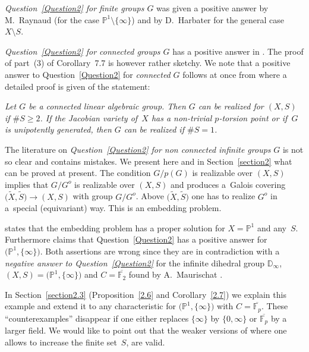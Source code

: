 \documentclass[pdftex]{sigma}
\numberwithin{equation}{section}
\begin{document}
{\it Question~{\rm \ref{Question2}} for finite groups $G$} was given a positive answer by M.~Raynaud (for the case $\mathbb{P}^1\setminus \{\infty \}$) and by D.~Harbater for the general case~$X\setminus S$.

{\it Question~{\rm \ref{Question2}} for connected groups $G$} has a positive answer in \cite[Corollary~7.7]{Ma-vdP1}. The proof of part~(3) of Corollary~7.7 is however rather sketchy. We note that a positive answer to Question~\ref{Question2} for {\it connected} $G$ follows at once from \cite[Theorem 9.12] {R} where a detailed proof is given of the statement:

{\it Let $G$ be a connected linear algebraic group. Then $G$ can be realized for $(X,S)$ if $\#S\geq 2$. If the Jacobian variety of~$X$ has a non-trivial $p$-torsion point or if~$G$ is unipotently generated, then $G$ can be realized if $\#S=1$.}

The literature on {\it Question~{\rm \ref{Question2}} for non connected infinite groups} $G$ is not so clear and contains mistakes. We present here and in Section~\ref{section2} what can be proved at present. The condition $G/p(G)$ is realizable over $(X,S)$ implies that $G/G^o$ is realizable over $(X,S)$ and produces a~Galois covering $\big(\tilde{X},\tilde{S}\big)\rightarrow (X,S)$ with group $G/G^o$. Above $\big(\tilde{X},\tilde{S}\big)$ one has to realize $G^o$ in a~special (equivariant) way. This is an embedding problem.

\cite[Proposition 8.7]{Ma-vdP2} states that the embedding problem has a proper solution for $X=\mathbb{P}^1$ and any~$S$. Furthermore \cite[Theorem~8.11]{Ma-vdP2} claims that Question~\ref{Question2} has a positive answer for~$\big(\mathbb{P}^1,\{\infty \}\big)$. Both assertions are wrong since they are in contradiction with a {\it negative answer to Question~{\rm \ref{Question2}}} for the infinite dihedral group $\mathbb{D}_\infty$, $(X,S)=\big(\mathbb{P}^1, \{\infty \}\big)$ and $C=\overline{\mathbb{F}_2}$ found by A.~Maurischat \cite[Theorem~9.1]{R}.

In Section~\ref{section2.3} (Proposition~\ref{2.6} and Corollary~\ref{2.7}) we explain this example and extend it to any characteristic for $\big(\mathbb{P}^1,\{\infty \}\big)$
with $C=\overline{\mathbb{F}_p}$. These ``counterexamples'' disappear if one either replaces $\{\infty \}$ by $\{0,\infty \}$ or $\overline{\mathbb{F}_p}$ by a larger field. We would like to point out that the weaker versions of \cite[Proposition~8.7, Theorems~8.8 and~8.11]{Ma-vdP2} where one allows to increase the finite set~$S$, are valid.
\end{document}
